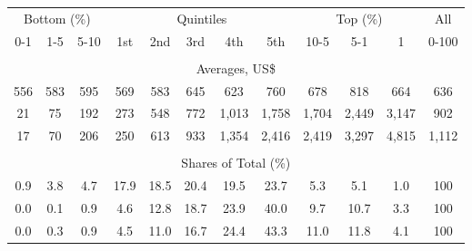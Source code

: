 \begin{tabular}{c c c| c c c c c| c c c| c}
\toprule
\multicolumn{3}{c|}{Bottom (\%)} & \multicolumn{5}{c|}{Quintiles} & \multicolumn{3}{c|}{Top (\%)} & All  \\
0-1 & 1-5 & 5-10 &  1st & 2nd & 3rd & 4th & 5th & 10-5 & 5-1 & 1 & 0-100 \\
\midrule \\
\multicolumn{12}{c}{Averages, US\$} \\
\midrule
556  & 583  & 595  & 569  & 583  & 645  & 623  & 760  & 678  & 818  & 664  & 636 \\
21 & 75 & 192 & 273 & 548 & 772 & 1,013 & 1,758 & 1,704 & 2,449 & 3,147 & 902 \\
17 & 70 & 206 & 250 & 613 & 933 & 1,354 & 2,416 & 2,419 & 3,297 & 4,815 & 1,112 \\
\midrule \\
\multicolumn{12}{c}{Shares of Total (\%)} \\
\midrule
0.9   & 3.8   & 4.7   & 17.9   & 18.5   & 20.4   & 19.5   & 23.7   & 5.3   & 5.1   & 1.0   & 100 \\
0.0  & 0.1  & 0.9  & 4.6  & 12.8  & 18.7  & 23.9  & 40.0  & 9.7  & 10.7  & 3.3  & 100 \\
0.0  & 0.3  & 0.9  & 4.5  & 11.0  & 16.7  & 24.4  & 43.3  & 11.0  & 11.8  & 4.1  & 100 \\
\bottomrule
\end{tabular}